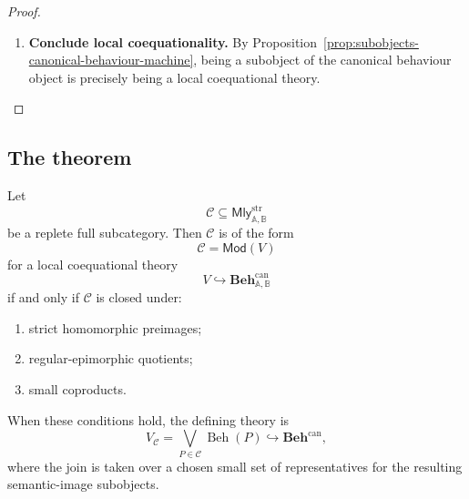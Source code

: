 \begin{proof}
\begin{enumerate}
        \item \textbf{Conclude local coequationality.}
        By Proposition~\ref{prop:subobjects-canonical-behaviour-machine},
        being a subobject of the canonical behaviour object is precisely being
        a local coequational theory.
    \end{enumerate}
\end{proof}

\subsection{The theorem}
\label{subsec:local-coequational-birkhoff-theorem}

\begin{theorem}
\label{thm:local-coequational-birkhoff}
    Let
    \[
        \mathcal C\subseteq\mathsf{Mly}^{\mathrm{str}}_{\mathbb A,\mathbb B}
    \]
    be a replete full subcategory. Then \(\mathcal C\) is of the form
    \[
        \mathcal C=\mathsf{Mod}(V)
    \]
    for a local coequational theory
    \[
        V\hookrightarrow\mathbf{Beh}^{\mathrm{can}}_{\mathbb A,\mathbb B}
    \]
    if and only if \(\mathcal C\) is closed under:
    \begin{enumerate}
        \item strict homomorphic preimages;
        \item regular-epimorphic quotients;
        \item small coproducts.
    \end{enumerate}
    When these conditions hold, the defining theory is
    \[
        V_{\mathcal C}
        =
        \bigvee_{P\in\mathcal C}\operatorname{Beh}(P)
        \hookrightarrow\mathbf{Beh}^{\mathrm{can}},
    \]
    where the join is taken over a chosen small set of representatives for the
    resulting semantic-image subobjects.
\end{theorem}

